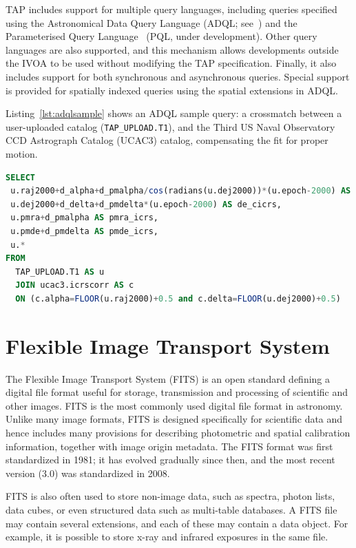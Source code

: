 TAP includes support for multiple query languages, including queries specified using the Astronomical Data Query Language (ADQL; see~\cite{2008adql.ivoav0910O}) and the Parameterised Query Language~\cite{IVOA-Data-Access-Layer-Working-Group:2009lr} (PQL, under development). Other query languages are also supported, and this mechanism allows developments outside the IVOA to be used without modifying the TAP specification. Finally, it also includes support for both synchronous and asynchronous queries. Special support is provided for spatially indexed queries using the spatial extensions in ADQL. 

Listing~\ref{lst:adqlsample} shows an ADQL sample query: a crossmatch between a user-uploaded catalog (\texttt{TAP\_UPLOAD.T1}), and
the Third US Naval Observatory CCD Astrograph Catalog (UCAC3) %
catalog, compensating the fit for proper motion.

\begin{lstlisting}[float,language=SQL,caption={ADQL sample query: the results will be a crossmatch between a user-uploaded catalog, and the UCAC3 catalog, compensating the fit for proper motion.},label=lst:adqlsample]
SELECT 
 u.raj2000+d_alpha+d_pmalpha/cos(radians(u.dej2000))*(u.epoch-2000) AS ra_icrs,
 u.dej2000+d_delta+d_pmdelta*(u.epoch-2000) AS de_cicrs,
 u.pmra+d_pmalpha AS pmra_icrs,
 u.pmde+d_pmdelta AS pmde_icrs,
 u.*
FROM
  TAP_UPLOAD.T1 AS u
  JOIN ucac3.icrscorr AS c
  ON (c.alpha=FLOOR(u.raj2000)+0.5 and c.delta=FLOOR(u.dej2000)+0.5)
\end{lstlisting}


\section{Flexible Image Transport System}

The
Flexible Image Transport System (FITS) is an open standard defining a digital file format useful for storage, transmission and processing of scientific and other images. FITS is the most commonly used digital file format in astronomy. Unlike many image formats, FITS is designed specifically for scientific data and hence includes many provisions for describing photometric and spatial calibration information, together with image origin metadata. The FITS format was first standardized in 1981; it has evolved gradually since then, and the most recent version (3.0) was standardized in 2008. 
  
FITS is also often used to store non-image data, such as spectra, photon lists, data cubes, or even structured data such as multi-table databases. A FITS file may contain several extensions, and each of these may contain a data object. For example, it is possible to store x-ray and infrared exposures in the same file. 
 
